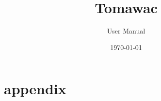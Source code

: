 \documentclass[Tomawac]{../../data/TelemacDoc} %
\begin{document}
\let\cleardoublepage\clearpage

\title{Tomawac}
\subtitle{User Manual}
\version{\telmaversion}
\date{\today}
\maketitle
\clearpage



\newpage

\thispagestyle{empty}

\TelemacCopyright{}



\pagestyle{empty} %

\tableofcontents%


\pagestyle{fancy} %











\newpage
\appendix
\chapter{appendix}









\end{document}
